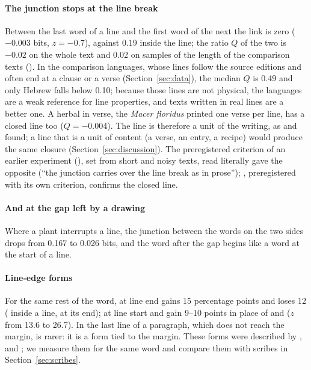 \paragraph{The junction stops at the line break} Between the last word of a line and the first word of the next the link
is zero ($-0.003$ bits, $z = -0.7$), against 0.19 inside the line; the ratio $Q$ of the two is $-0.02$ on the whole text
and 0.02 on samples of the length of the comparison texts (). In the comparison languages, whose lines follow
the source editions and often end at a clause or a verse (Section~\ref{sec:data}), the median $Q$ is 0.49 and only
Hebrew falls below 0.10; because those lines are not physical, the languages are a weak reference for line
properties, and texts written in real lines are a better one. A herbal in verse, the
\emph{Macer floridus} printed one verse per line, has a closed line too ($Q = -0.004$). The line is therefore a unit of
the writing, as \citet{currier1976} and \citet{rozanova2026} found; a line that is a unit of content (a verse, an entry,
a recipe) would produce the same closure (Section~\ref{sec:discussion}). The preregistered criterion of an earlier
experiment (), set from short and noisy texts, read literally gave the opposite (``the junction carries
over the line break as in prose''); , preregistered with its own criterion, confirms the closed line.

\paragraph{And at the gap left by a drawing} Where a plant interrupts a line, the junction between the words on the two
sides drops from 0.167 to 0.026 bits, and the word after the gap begins like a word at the start of a line.

\paragraph{Line-edge forms} For the same rest of the word, at line end  gains 15 percentage points and 
loses 12 ( inside a line,  at its end); at line start  and  gain 9--10 points in place
of  and  ($z$ from 13.6 to 26.7). In the last line of a paragraph, which does not reach the margin,
 is rarer: it is a form tied to the margin. These forms were described by \citet{currier1976},
\citet{smith2015linestart,smith2016m} and \citet{feaster2020,feaster2022}; we measure them for the same word and compare
them with scribes in Section~\ref{sec:scribes}.

